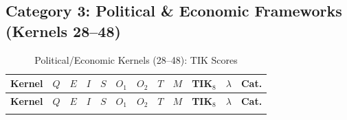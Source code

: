 \documentclass[11pt,a4paper]{article}
\theoremstyle{definition}
\theoremstyle{remark}
\begin{document}
\subsection{Category 3: Political \& Economic Frameworks
  (Kernels 28--48)}
\label{sec:cat3}

\begin{longtable}{@{}l|cccccccc|cc|c@{}}
\caption{Political/Economic Kernels (28--48): TIK Scores}
\label{tab:political}\\
\toprule
\textbf{Kernel} &
$Q$ & $E$ & $I$ & $S$ & $O_1$ & $O_2$ & $T$ & $M$ &
\textbf{TIK$_8$} & $\lambda$ & \textbf{Cat.} \\
\midrule
\endfirsthead
\toprule
\textbf{Kernel} &
$Q$ & $E$ & $I$ & $S$ & $O_1$ & $O_2$ & $T$ & $M$ &
\textbf{TIK$_8$} & $\lambda$ & \textbf{Cat.} \\
\midrule
\endhead
\bottomrule
\endlastfoot


\end{longtable}
\end{document}
